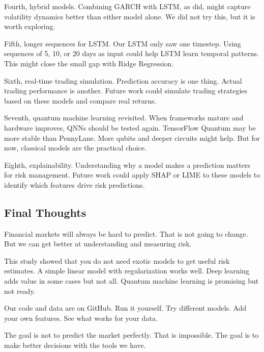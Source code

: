 \documentclass[12pt,a4paper]{article}
\begin{document}
Fourth, hybrid models. Combining GARCH with LSTM, as \citet{leber2025} did, might capture volatility dynamics better than either model alone. We did not try this, but it is worth exploring.

Fifth, longer sequences for LSTM. Our LSTM only saw one timestep. Using sequences of 5, 10, or 20 days as input could help LSTM learn temporal patterns. This might close the small gap with Ridge Regression.

Sixth, real-time trading simulation. Prediction accuracy is one thing. Actual trading performance is another. Future work could simulate trading strategies based on these models and compare real returns.

Seventh, quantum machine learning revisited. When frameworks mature and hardware improves, QNNs should be tested again. TensorFlow Quantum may be more stable than PennyLane. More qubits and deeper circuits might help. But for now, classical models are the practical choice.

Eighth, explainability. Understanding why a model makes a prediction matters for risk management. Future work could apply SHAP or LIME to these models to identify which features drive risk predictions.

\subsection{Final Thoughts}
Financial markets will always be hard to predict. That is not going to change. But we can get better at understanding and measuring risk.

This study showed that you do not need exotic models to get useful risk estimates. A simple linear model with regularization works well. Deep learning adds value in some cases but not all. Quantum machine learning is promising but not ready.

Our code and data are on GitHub. Run it yourself. Try different models. Add your own features. See what works for your data.

The goal is not to predict the market perfectly. That is impossible. The goal is to make better decisions with the tools we have.



\end{document}
